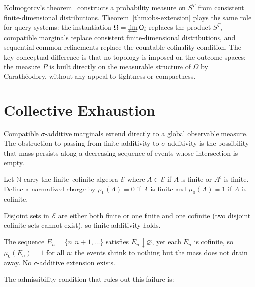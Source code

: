 \begin{remark}
\label{rem:kolmogorov}
Kolmogorov's theorem~\cite{Kolmogorov} constructs a probability measure on $S^T$ from consistent finite-dimensional distributions.  Theorem~\ref{thm:obs-extension} plays the same role for query systems: the instantiation $\Omega = \varprojlim
\mathsf{O}_{i}$ replaces the product $S^T$, compatible marginals replace
consistent finite-dimensional distributions, and sequential common refinements replace the countable-cofinality condition.  The key conceptual difference is that no topology is imposed on the outcome spaces: the measure $P$ is built directly on the measurable structure of $\Omega$ by Carathéodory, without any appeal to tightness or compactness.

\end{remark}


\section{Collective Exhaustion}
\label{sec:ce}

Compatible $\sigma$-additive marginals extend directly to a global observable measure.  The obstruction to passing from finite additivity to $\sigma$-additivity is the possibility that mass persists along a decreasing sequence of events whose intersection is empty.

\begin{example}
\label{ex:finite-cofinite}
Let $\mathbb{N}$ carry the finite--cofinite algebra $\mathcal{E}$ where $A \in \mathcal{E}$ if $A$ is finite or $A^c$ is finite. Define a normalized charge by $\mu_0(A) = 0$ if $A$ is finite and $\mu_0(A) = 1$ if $A$ is cofinite.

Disjoint sets in $\mathcal{E}$ are either both finite or one finite and one cofinite (two disjoint cofinite sets cannot exist), so finite additivity holds.

The sequence $E_n = \{n, n+1, \ldots\}$ satisfies $E_n \downarrow \varnothing$, yet each $E_n$ is cofinite, so $\mu_0(E_n) = 1$ for all $n$: the events shrink to nothing but the mass does not drain away.  No $\sigma$-additive extension exists.
\end{example}

\noindent The admissibility condition that rules out this failure is:

